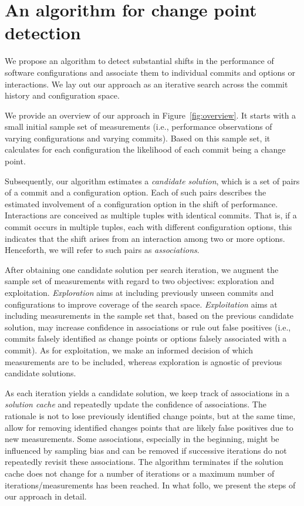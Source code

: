 \documentclass[sigconf]{acmart}
\begin{document}
	\section{An algorithm for change point detection}\label{sec:cpmodel}
	We propose an algorithm to detect substantial shifts in the performance of software configurations and associate them to individual commits and options or interactions. We lay out our approach as an iterative search across the commit history and configuration space. 
	
	We provide an overview of our approach in Figure~\ref{fig:overview}. 
	It starts with a small initial sample set of measurements (i.e., performance observations of varying configurations and varying commits). 
	Based on this sample set, it calculates for each configuration the likelihood of each commit being a change point. 
	
	Subsequently, our algorithm estimates a \emph{candidate solution}, which is a set of pairs of a commit and a configuration option. 
	Each of such pairs describes the estimated involvement of a configuration option in the shift of performance. 
	Interactions are conceived as multiple tuples with identical commits. That is, if a commit occurs in multiple tuples, each with different configuration options, this indicates that the shift arises from an interaction among two or more options. 
	Henceforth, we will refer to such pairs as \emph{associations}.
	
	After obtaining one candidate solution per search iteration, we augment the sample set of measurements with regard to two objectives: exploration and exploitation. 
	\emph{Exploration} aims at including previously unseen commits and configurations to improve coverage of the search space. 
	\emph{Exploitation} aims at including measurements in the sample set that, based on the previous candidate solution, may increase confidence in associations or rule out false positives (i.e., commits falsely identified as change points or options falsely associated with a commit). 
	As for exploitation, we make an informed decision of which measurements are to be included, whereas exploration is agnostic of previous candidate solutions.
	
	As each iteration yields a candidate solution, we keep track of associations in a \emph{solution cache} and repeatedly update the confidence of associations. 
	The rationale is not to lose previously identified change points, but at the same time, allow for removing identified changes points that are likely false positives due to new measurements.
	Some associations, especially in the beginning, might be influenced by sampling bias and can be removed if successive iterations do not repeatedly revisit these associations. 
	The algorithm terminates if the solution cache does not change for a number of iterations or a maximum number of iterations/measurements has been reached.
	In what follo, we present the steps of our approach in detail. 
	
\end{document}
